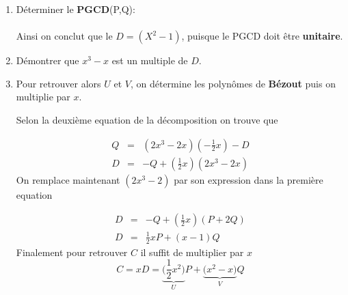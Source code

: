 \documentclass[12pt,a4paper,dvipsnames]{article}
\begin{document}
\begin{enumerate}
    \item Déterminer le \textbf{PGCD}(P,Q):\\

        \\

        Ainsi on conclut que le $D=(X^2-1)$, puisque le PGCD doit être
        \textbf{unitaire}.

\item Démontrer que $x^3-x$ est un multiple de $D$.\\


\item Pour retrouver alors $U$ et $V$, on  détermine les polynômes de
    \textbf{Bézout} puis on multiplie par $x$. 

    Selon la deuxième equation de la décomposition on trouve que 

    \begin{eqnarray}
        Q &=& (2x^3-2x)(-\frac{1}{2}x) - D\\
        D &=& -Q + (\frac{1}{2}x)(2x^3-2x)
    \end{eqnarray}
    On remplace maintenant $(2x^3-2)$ par son expression dans la première
    equation

    \begin{eqnarray}
        D &=& -Q+ (\frac{1}{2}x)(P + 2Q)\\
        D &=& \frac{1}{2}x P + (x-1)Q
    \end{eqnarray}
Finalement pour retrouver $C$ il suffit de multiplier par $x$
\begin{equation}
    C = xD = \underbrace{\big(\frac{1}{2}x^2\big)}_{U}P +
    \underbrace{\big(x^2-x\big)}_{V}Q
\end{equation}
\end{enumerate}

\end{document}
